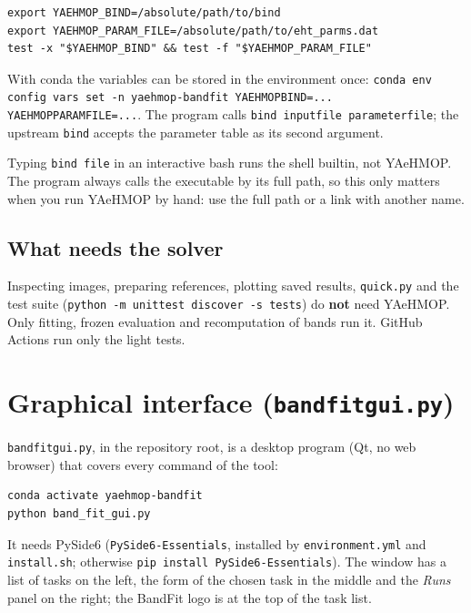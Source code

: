\documentclass[11pt,a4paper]{article}
\newcommand{\cmd}[1]{\texttt{#1}}
\renewcommand{\_}{\origunderscore\allowbreak}
\begin{document}
\begin{lstlisting}[style=sh]
export YAEHMOP_BIND=/absolute/path/to/bind
export YAEHMOP_PARAM_FILE=/absolute/path/to/eht_parms.dat
test -x "$YAEHMOP_BIND" && test -f "$YAEHMOP_PARAM_FILE"
\end{lstlisting}

With conda the variables can be stored in the environment once:
\cmd{conda env config vars set -n yaehmop-bandfit YAEHMOP\_BIND=... YAEHMOP\_PARAM\_FILE=...}.
The program calls \cmd{bind input\_file parameter\_file}; the upstream \cmd{bind} accepts the parameter
table as its second argument.

\begin{aviso}[\cmd{bind} is also a bash builtin]
Typing \cmd{bind file} in an interactive bash runs the shell builtin, not YAeHMOP. The program always
calls the executable by its full path, so this only matters when you run YAeHMOP by hand: use the full
path or a link with another name.
\end{aviso}

\subsection{What needs the solver}

Inspecting images, preparing references, plotting saved results, \cmd{quick.py} and the test suite
(\cmd{python -m unittest discover -s tests}) do \textbf{not} need YAeHMOP. Only fitting, frozen
evaluation and recomputation of bands run it. GitHub Actions run only the light tests.

\section{Graphical interface (\cmd{band\_fit\_gui.py})}\label{sec:gui}
\cmd{band\_fit\_gui.py}, in the repository root, is a desktop program (Qt, no web browser) that covers every
command of the tool:
\begin{lstlisting}[style=sh]
conda activate yaehmop-bandfit
python band_fit_gui.py
\end{lstlisting}
It needs PySide6 (\cmd{PySide6-Essentials}, installed by \cmd{environment.yml} and \cmd{install.sh}; otherwise
\cmd{pip install PySide6-Essentials}). The window has a list of tasks on the left, the form of the chosen task in the
middle and the \emph{Runs} panel on the right; the BandFit logo is at the top of the task list.
\end{document}
